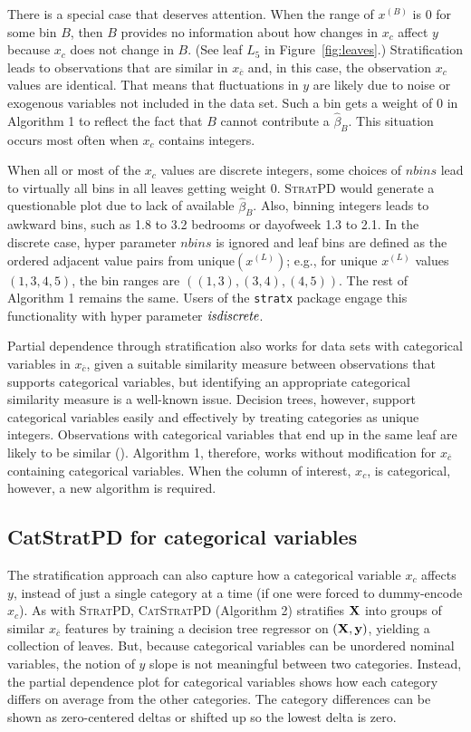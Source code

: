 \documentclass[12pt]{article}
\newcommand{\figref}[1]{Figure~\ref{#1}}
\newcommand{\spd}{\fontfamily{cmr}\textsc{\small StratPD}}
\newcommand{\cspd}{\fontfamily{cmr}\textsc{\small CatStratPD}}
\newcommand{\xnc}{$x_{\overline{c}}$}
\begin{document}
There is a special case that deserves attention. When the range of $x^{(B)}$ is 0 for some bin $B$, then $B$ provides no information about how changes in $x_c$ affect $y$ because $x_c$ does not change in $B$. (See leaf $L_5$ in \figref{fig:leaves}.)  Stratification leads to observations that are similar in \xnc{} and, in this case, the observation $x_c$ values are identical. That means that fluctuations in $y$ are likely due to noise or exogenous variables not included in the data set.  Such a bin gets a weight of 0 in Algorithm 1 to reflect the fact that $B$ cannot contribute a $\hat{\beta}_B$. This situation occurs most often when $x_c$ contains integers.

When all or most of the $x_c$ values are discrete integers, some choices of $nbins$ lead to virtually all bins in all leaves getting weight 0. \spd{} would generate a questionable plot due to lack of available $\hat{\beta}_B$. Also, binning integers leads to awkward bins, such as 1.8 to 3.2 bedrooms or dayofweek 1.3 to 2.1. In the discrete case, hyper parameter $nbins$ is ignored and leaf bins are defined as the ordered adjacent value pairs from unique$(x^{(L)})$; e.g., for unique $x^{(L)}$ values $(1,3,4,5)$, the bin ranges are $((1,3), (3,4), (4,5))$. The rest of Algorithm 1 remains the same. Users of the {\tt stratx} package engage this functionality with hyper parameter ${\it isdiscrete}$.

Partial dependence through stratification also works for data sets with categorical variables in \xnc{}, given a suitable similarity measure between observations that supports categorical variables, but identifying an appropriate categorical similarity measure is a well-known issue.  Decision trees, however, support categorical variables easily and effectively by treating categories as unique integers. Observations with categorical variables that end up in the same leaf are likely to be similar (\cite{RFunsup}). Algorithm 1, therefore, works without modification for \xnc{} containing categorical variables. When the column of interest, $x_c$, is categorical, however, a new algorithm is required.

\subsection{CatStratPD for categorical variables}

The stratification approach can also capture how a categorical variable $x_c$ affects $y$, instead of just a single category at a time (if one were forced to dummy-encode $x_c$). As with \spd{},  \cspd{} (Algorithm 2) stratifies $\bf X$ into groups of similar \xnc{} features by training a decision tree regressor on $({\bf X}, {\bf y})$, yielding a collection of leaves. But, because categorical variables can be unordered nominal variables, the notion of $y$ slope is not meaningful between two categories.  Instead, the partial dependence plot for categorical variables shows how each category differs on average from the other categories. The category differences can be shown as zero-centered deltas or shifted up so the lowest delta is zero.
\end{document}
